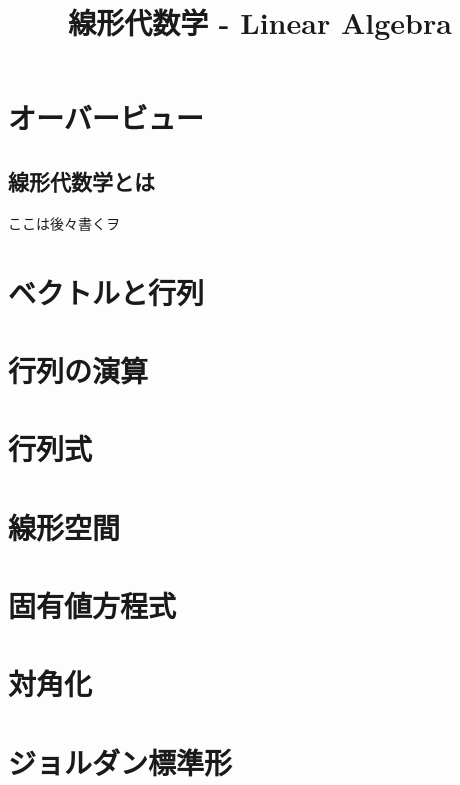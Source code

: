 \documentclass[a4paper]{jsreport}
\title{線形代数学 - Linear Algebra}
\begin{document}
    \maketitle

    \tableofcontents

    \chapter{オーバービュー}
        \section{線形代数学とは}
            ここは後々書くヲ
    

    \chapter{ベクトルと行列}


    \chapter{行列の演算}
    
    
    \chapter{行列式}
    
    
    \chapter{線形空間}
    
    
    \chapter{固有値方程式}

    \chapter{対角化}
    
    
    \chapter{ジョルダン標準形}
        
\end{document}
